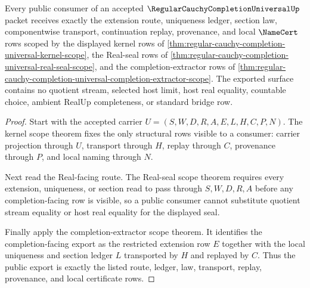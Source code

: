 \begin{theorem}
\label{thm:regular-cauchy-completion-universal-public-export}
Every public consumer of an accepted $\RegularCauchyCompletionUniversalUp$ packet receives exactly the extension route, uniqueness ledger, section law, componentwise transport, continuation replay, provenance, and local $\NameCert$ rows scoped by the displayed kernel rows of \autoref{thm:regular-cauchy-completion-universal-kernel-scope}, the Real-seal rows of \autoref{thm:regular-cauchy-completion-universal-real-seal-scope}, and the completion-extractor rows of \autoref{thm:regular-cauchy-completion-universal-completion-extractor-scope}. The exported surface contains no quotient stream, selected host limit, host real equality, countable choice, ambient RealUp completeness, or standard bridge row.
\end{theorem}
\begin{proof}
Start with the accepted carrier $U=(S,W,D,R,A,E,L,H,C,P,N)$. The kernel scope theorem fixes the only structural rows visible to a consumer: carrier projection through $U$, transport through $H$, replay through $C$, provenance through $P$, and local naming through $N$.

Next read the Real-facing route. The Real-seal scope theorem requires every extension, uniqueness, or section read to pass through $S,W,D,R,A$ before any completion-facing row is visible, so a public consumer cannot substitute quotient stream equality or host real equality for the displayed seal.

Finally apply the completion-extractor scope theorem. It identifies the completion-facing export as the restricted extension row $E$ together with the local uniqueness and section ledger $L$ transported by $H$ and replayed by $C$. Thus the public export is exactly the listed route, ledger, law, transport, replay, provenance, and local certificate rows.
\end{proof}

